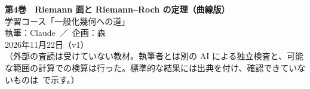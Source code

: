 
\usepackage{tikz}
\usepackage{tikz-cd}
\usetikzlibrary{arrows.meta,positioning,calc}
\newcommand{\Oc}{\mathcal O}
\newcommand{\CP}{\mathbb{CP}}
\newcommand{\Div}{\mathrm{Div}}
\newcommand{\Jac}{\mathrm{Jac}}
\newcommand{\ord}{\operatorname{ord}}
\newcommand{\divv}{\operatorname{div}}
\newcommand{\Res}{\operatorname{Res}}
\newcommand{\Lat}{\Lambda}
\newcommand{\Ker}{\operatorname{Ker}}
\newcommand{\Aut}{\operatorname{Aut}}
\renewcommand{\Re}{\operatorname{Re}}
\renewcommand{\Im}{\operatorname{Im}}
\renewcommand{\contentsname}{目次}
\usepackage{fontspec}\newfontfamily{}
\newcommand{\Cech}{{\lmfont \v{C}ech}}

\sloppy
\begin{center}
{\LARGE\bfseries\sffamily 第4巻　Riemann 面と Riemann--Roch の定理（曲線版）}\\[8pt]
{\large 学習コース「一般化幾何への道」}\\[6pt]
{\large 執筆：Claude\ ／\ 企画：森}\\[3pt]
2026年11月22日（v1）\\[3pt]
{\small （外部の査読は受けていない教材。執筆者とは別の AI による独立検査と、可能な範囲の計算での検算は行った。標準的な結果には出典を付け、確認できていないものは\tQ\ で示す。）}
\end{center}

